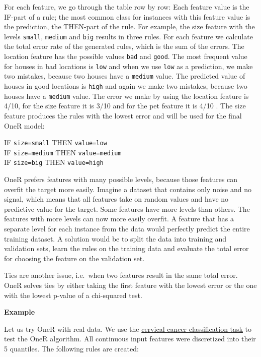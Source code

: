 \documentclass[12pt,]{krantz}
\begin{document}
For each feature, we go through the table row by row: Each feature value
is the IF-part of a rule; the most common class for instances with this
feature value is the prediction, the THEN-part of the rule. For example,
the size feature with the levels \texttt{small}, \texttt{medium} and
\texttt{big} results in three rules. For each feature we calculate the
total error rate of the generated rules, which is the sum of the errors.
The location feature has the possible values \texttt{bad} and
\texttt{good}. The most frequent value for houses in bad locations is
\texttt{low} and when we use \texttt{low} as a prediction, we make two
mistakes, because two houses have a \texttt{medium} value. The predicted
value of houses in good locations is \texttt{high} and again we make two
mistakes, because two houses have a \texttt{medium} value. The error we
make by using the location feature is 4/10, for the size feature it is
3/10 and for the pet feature it is 4/10 . The size feature produces the
rules with the lowest error and will be used for the final OneR model:

IF \texttt{size=small} THEN \texttt{value=low}\\
IF \texttt{size=medium} THEN \texttt{value=medium}\\
IF \texttt{size=big} THEN \texttt{value=high}

OneR prefers features with many possible levels, because those features
can overfit the target more easily. Imagine a dataset that contains only
noise and no signal, which means that all features take on random values
and have no predictive value for the target. Some features have more
levels than others. The features with more levels can now more easily
overfit. A feature that has a separate level for each instance from the
data would perfectly predict the entire training dataset. A solution
would be to split the data into training and validation sets, learn the
rules on the training data and evaluate the total error for choosing the
feature on the validation set.

Ties are another issue, i.e.~when two features result in the same total
error. OneR solves ties by either taking the first feature with the
lowest error or the one with the lowest p-value of a chi-squared test.

\textbf{Example}

Let us try OneR with real data. We use the
\protect\hyperlink{cervical}{cervical cancer classification task} to
test the OneR algorithm. All continuous input features were discretized
into their 5 quantiles. The following rules are created:
\end{document}
